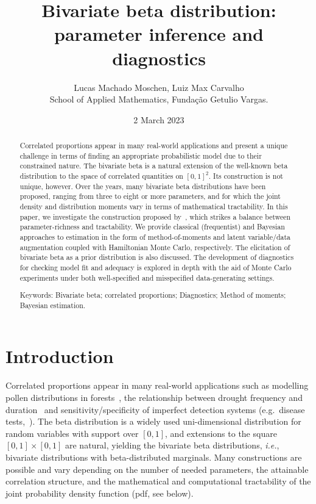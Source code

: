 \documentclass[a4paper, notitlepage, 10pt]{article}
\title{\vspace{-9ex}\centering \bf Bivariate beta distribution: parameter inference and diagnostics}
\author{
Lucas Machado Moschen, Luiz Max Carvalho\\
School of Applied Mathematics, Fundação Getulio Vargas.}
\date{2 March 2023}
\theoremstyle{definition}
\begin{document}
\maketitle

\begin{abstract}
Correlated proportions appear in many real-world applications and present a unique challenge in terms of finding an appropriate probabilistic model due to their constrained nature.
The bivariate beta is a natural extension of the well-known beta distribution to the space of correlated quantities on ${[0, 1]}^2$.
Its construction is not unique, however.
Over the years, many bivariate beta distributions have been proposed, ranging from three to eight or more parameters, and for which the joint density and distribution moments vary in terms of mathematical tractability.
In this paper, we investigate the construction proposed by~\cite{olkin2015constructions}, which strikes a balance between parameter-richness and tractability.
We provide classical (frequentist) and Bayesian approaches to estimation in the form of method-of-moments and latent variable/data augmentation coupled with Hamiltonian Monte Carlo, respectively.
The elicitation of bivariate beta as a prior distribution is also discussed.
The development of diagnostics for checking model fit and adequacy is explored in depth with the aid of Monte Carlo experiments under both well-specified and misspecified data-generating settings.

Keywords: Bivariate beta; correlated proportions; Diagnostics; Method of moments; Bayesian estimation. 
\end{abstract}

\section{Introduction}

Correlated proportions appear in many real-world applications such as modelling pollen distributions in forests~\citep{nadarajah_new_2017}, the relationship between drought frequency and duration~\citep{nadarajah2007new} and sensitivity/specificity of imperfect detection systems (e.g.\ disease tests,~\cite{dahabreh2013empirical}).
The beta distribution is a widely used uni-dimensional distribution for random variables with support over $[0,1]$, and extensions to the square $[0,1] \times [0,1]$  are natural, yielding the bivariate beta distributions, {\it i.e.}, bivariate distributions with beta-distributed marginals.
Many constructions are possible and vary depending on the number of needed parameters, the attainable correlation structure, and the mathematical and computational tractability of the joint probability density function (pdf, see below).
\end{document}

